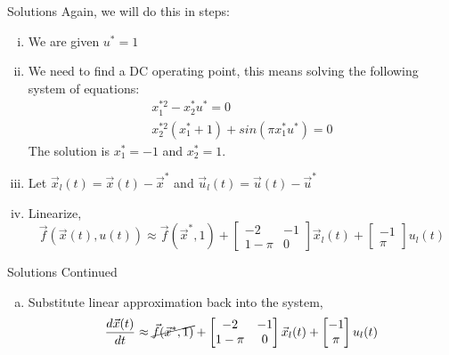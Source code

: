 \documentclass{beamer}
\begin{document}
	\begin{frame}{Solutions}
	Again, we will do this in steps: 
	\begin{enumerate}[(i)]
	    \item We are given $u^* = 1$ \pause
	    \item We need to find a DC operating point, this means solving the following system of equations:
	    \begin{align}
	        x_1^{*2}- x_2^*u^* = 0 \\
	        x_2^{*2}(x_1^* + 1) + sin(\pi x_1^*u^*) = 0
	    \end{align} 
	    The solution is $x_1^* = -1$ and $x_2^* = 1$. \pause \\
	    \item Let $\vec{x}_l(t) = \vec{x}(t) - \vec{x}^*$ and $\vec{u}_l(t) = \vec{u}(t) - \vec{u}^*$ \pause \\
	    \item Linearize, 
	    \[ \vec{f}(\vec{x}(t), u(t)) \approx 
	   \vec{f}(\vec{x}^*, 1) + \begin{bmatrix}
	    -2 & -1 \\
	    1 - \pi & 0 
	    \end{bmatrix} 
	   \vec{x}_l(t) + \begin{bmatrix}
	   -1 \\ \pi
	   \end{bmatrix}
	   u_l(t)
	    \]

	        
	  
	\end{enumerate}
	\end{frame}

	\begin{frame}{Solutions Continued}
	    \begin{enumerate}[(v)]
	        \item Substitute linear approximation back into the system,
	            \[ \frac{d\vec{x}(t)}{dt} \approx 
	            \cancel{\vec{f}(\vec{x}^*, 1)} + \begin{bmatrix}
	            -2 & -1 \\
	            1 - \pi & 0 
	            \end{bmatrix} 
	            \vec{x}_l(t) + \begin{bmatrix}
	            -1 \\ \pi
	            \end{bmatrix}
	            u_l(t)
	            \]
	    \end{enumerate}
	\end{frame}
\end{document}
